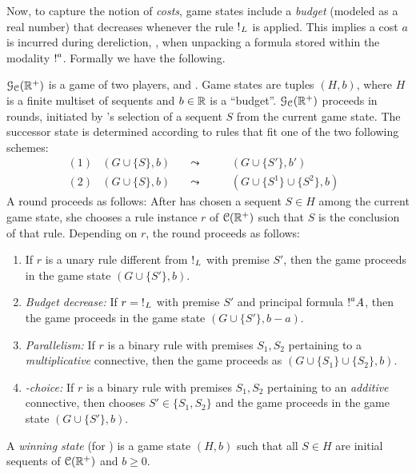 Now, to capture the notion of {\em costs}, game states include a {\em budget} (modeled as a real number) that decreases whenever the rule $\hbox{$\mathop{!}^{}$}_L$ is applied. This implies a cost $a$ is incurred during dereliction, \ie, when unpacking a formula stored within the modality $\hbox{$\mathop{!}^{a}$}{}$.
%
Formally we have the following.
\begin{definition}\label{definition:GAIMALLR}
    $\mathcal{G}_{\mathcal{C}}(\mathbb{R}^+)$ is a game of two players, \I and \II. Game states are tuples $(H,b)$, where $H$ is a finite multiset of sequents and $b\in\mathbb{R}$ is a ``budget''.
$\mathcal{G}_{\mathcal{C}}(\mathbb{R}^+)$ proceeds in rounds, initiated by \I's selection of a sequent $S$ from the current game state. The successor state is determined according to rules that fit one of the two following schemes:
$$
\begin{array}{lllll}
{(1)} &(G\cup\{S\},b)&\quad\leadsto\quad&  \quad (G\cup\{S'\},b') & \\
{(2)} &(G\cup\{S\},b)&\quad\leadsto\quad&  \quad (G\cup\{S^1\}\cup\{S^2\},b)
\end{array}
$$
A round proceeds as follows: After \I has chosen a sequent $S\in H$ among the current game state, she chooses a rule  instance  $r$ of $\mathcal{C}(\mathbb{R}^+)$ such that $S$ is the conclusion of that rule. Depending on  $r$, the round proceeds as follows:
\begin{enumerate}
\item If $r$ is a unary rule different from $\hbox{$\mathop{!}^{}$}_L$ with premise $S'$, then the game proceeds in the game state $(G\cup\{S'\},b)$.
\item {\em Budget decrease:} If $r=\hbox{$\mathop{!}^{}$}_L$ with premise $S'$ and principal formula $\hbox{$\mathop{!}^{a}$}A$, then the game proceeds in the game state $(G\cup\{S'\},b-a)$.
\item {\em Parallelism:} If $r$ is a binary rule with premises $S_1,S_2$ pertaining to a \emph{multiplicative} connective, then the game proceeds as $(G\cup\{S_1\}\cup\{S_2\},b)$.
\item {\em \II-choice:} If $r$ is a binary rule with premises $S_1,S_2$ pertaining to an \emph{additive} connective, then \II chooses $S'\in\{S_1,S_2\}$ and the game proceeds in the game state $(G\cup\{S'\},b)$.
\end{enumerate}

\noindent A {\em winning state} (for \I) is a game state $(H,b)$ such that all $S\in H$ are initial sequents of $\mathcal{C}(\mathbb{R}^+)$ and $b\geq 0$.
\end{definition}

